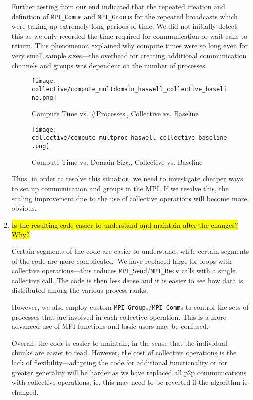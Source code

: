 \begin{enumerate}
	Further testing from our end indicated that the repeated creation and definition of \verb!MPI_Comm!s and
	\verb!MPI_Group!s for the repeated broadcasts which were taking up extremely long periods of time. We did
	not initially detect this as we only recorded the time required for communication or wait calls to return.
	This phenomenon explained why compute times were so long even for very small sample sizes---the overhead
	for creating additional communication channels and groups was dependent on the number of processes. 

		\begin{figure}[h] %
		\centering
		\texttt{[image: collective/compute\_multdomain\_haswell\_collective\_baseline.png]}
		\caption{Compute Time vs. \#Processes., Collective vs. Baseline}
		\label{fig:compute_multdomain_collective_baseline}
	\end{figure}	
	
	\begin{figure}[h] %
		\centering
		\texttt{[image: collective/compute\_multproc\_haswell\_collective\_baseline.png]}
		\caption{Compute Time vs. Domain Size., Collective vs. Baseline}
		\label{fig:compute_multprocess_collective_baseline}
	\end{figure}	
	
	Thus, in order to resolve this situation, we need to investigate cheaper ways to set up communication
	and groups in the MPI. If we resolve this, the scaling improvement due to the use of collective 
	operations will become more obvious.
	
	\item \hl{Is the resulting code easier to understand and maintain after the changes? Why?}	
	
	Certain segments of the code are easier to understand, while certain segments of the code are more 		
	complicated. We have replaced large for loops with collective operations---this reduces 
	\verb!MPI_Send!/\verb!MPI_Recv! calls with a single collective call. The code is then less dense and it
	 is easier to see how data is distributed among the various process ranks.

	However, we also employ custom \verb!MPI_Group!s/\verb!MPI_Comm!s to control the sets of 
	processes that are involved in each collective operation. This is a more advanced use of MPI 
	functions and basic users may be confused. 

	Overall, the code is easier to maintain, in the sense that the individual chunks are easier to 
	read. However, the cost of collective operations is the lack of flexibility---adapting the code 
	for additional functionality or for greater generality will be harder as we have replaced all p2p 
	communications with collective operations, ie. this may need to be reverted if the algorithm is 
	changed.	
	
\end{enumerate}

		


